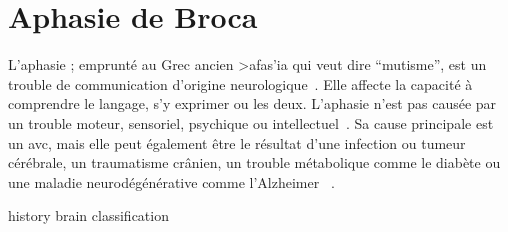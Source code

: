 \chapter{Aphasie de Broca}

L'aphasie ; emprunté au Grec ancien \textgreek{>afas'ia} qui veut dire ``mutisme'',
est un trouble de communication d'origine neurologique~\cite{Larousse}. 
Elle affecte la capacité à comprendre le langage, s'y exprimer ou les deux.
L'aphasie n'est pas causée par un trouble moteur, sensoriel, psychique ou intellectuel~\cite{Chapey_2008}.
Sa cause principale est un \Acrshort{avc}, 
mais elle peut également être le résultat d'une infection ou tumeur cérébrale, un traumatisme crânien, 
un trouble métabolique comme le diabète ou une maladie neurodégénérative comme l'Alzheimer ~\cite{Hallowell_2017}.

{history}
{brain}
{classification}